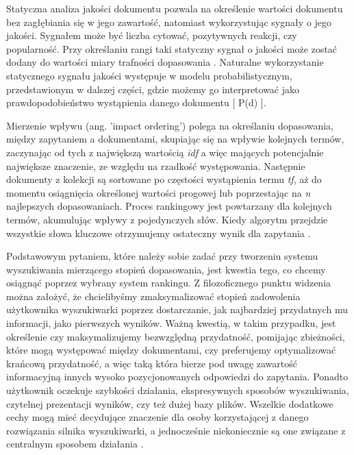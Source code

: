 Statyczna analiza jakości dokumentu pozwala na określenie wartości dokumentu bez
zagłębiania się w jego zawartość, natomiast wykorzystując sygnały o jego jakości. Sygnałem może być
liczba cytować, pozytywnych reakcji, czy popularność. Przy określaniu rangi taki statyczny sygnał o jakości
może zostać dodany do wartości miary trafności dopasowania \autocite[s. 175-177]{introtoinformationretrieval}. Naturalne wykorzystanie statycznego sygnału
jakości występuje w modelu probabilistycznym, przedstawionym w dalszej części, gdzie możemy go
interpretować jako prawdopodobieństwo wystąpienia danego dokumentu [ P(d) ].\newline

Mierzenie wpływu (ang. 'impact ordering') polega na określaniu dopasowania, między
zapytaniem a dokumentami, skupiając się na wpływie kolejnych termów, zaczynając od tych z
największą wartością {\it idf} a więc mających potencjalnie największe znaczenie, ze względu na rzadkość występowania. Następnie dokumenty z
kolekcji są sortowane po częstości wystąpienia termu {\it tf}, aż do momentu osiągnięcia określonej wartości
progowej lub poprzestając na {\it n} najlepszych dopasowaniach. Proces rankingowy jest
powtarzany dla kolejnych termów, akumulując wpływy z pojedynczych słów. Kiedy algorytm przejdzie
wszystkie słowa kluczowe otrzymujemy ostateczny wynik dla zapytania \autocite[s. 177-178]{introtoinformationretrieval}.\newline

Podstawowym pytaniem, które należy sobie zadać przy tworzeniu systemu wyszukiwania
mierzącego stopień dopasowania, jest kwestia tego, co chcemy osiągnąć poprzez wybrany system
rankingu. Z filozoficznego punktu widzenia można założyć, że chcielibyśmy zmaksymalizować stopień
zadowolenia użytkownika wyszukiwarki poprzez dostarczanie, jak najbardziej przydatnych mu informacji, jako pierwszych wyników. Ważną kwestią, w takim przypadku, jest określenie czy
maksymalizujemy bezwzględną przydatność, pomijając zbieżności, które mogą występować między
dokumentami, czy preferujemy optymalizować krańcową przydatność, a więc taką która bierze pod
uwagę zawartość informacyjną innych wysoko pozycjonowanych odpowiedzi do zapytania. Ponadto
użytkownik oczekuje szybkości działania, ekspresywnych sposobów wyszukiwania, czytelnej
prezentacji wyników, czy też dużej bazy plików. Wszelkie dodatkowe cechy mogą mieć decydujące
znaczenie dla osoby korzystającej z danego rozwiązania silnika wyszukiwarki, a jednocześnie
niekoniecznie są one związane z centralnym sposobem działania \autocite[s. 205-207]{introtoinformationretrieval}.\newline

